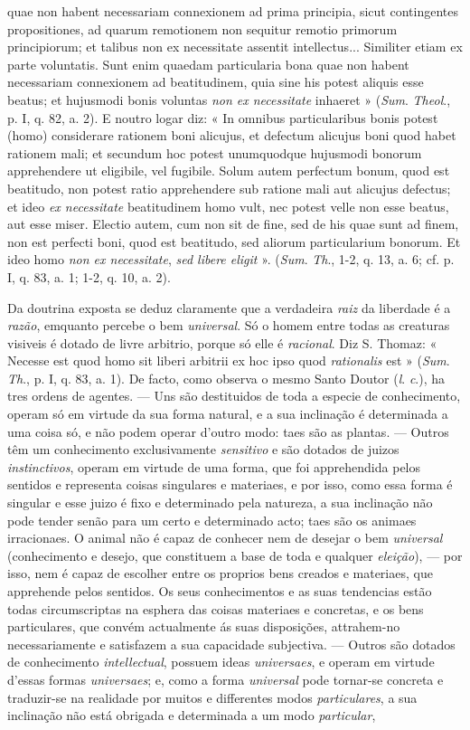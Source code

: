 quae non habent necessariam connexionem ad prima principia, sicut contingentes propositiones, ad quarum remotionem non sequitur remotio primorum principiorum; et talibus non ex necessitate assentit intellectus... Similiter etiam ex parte voluntatis. Sunt enim quaedam particularia bona quae non habent necessariam connexionem ad beatitudinem, quia sine his potest aliquis esse beatus; et hujusmodi bonis voluntas \emph{non ex necessitate} inhaeret » (\emph{Sum}. \emph{Theol}., p. I, q. 82, a. 2). E noutro logar diz: « In omnibus particularibus bonis potest (homo) considerare rationem boni alicujus, et defectum alicujus boni quod habet rationem mali; et secundum hoc potest unumquodque hujusmodi bonorum apprehendere ut eligibile, vel fugibile. Solum autem perfectum bonum, quod est beatitudo, non potest ratio apprehendere sub ratione mali aut alicujus defectus; et ideo \emph{ex necessitate} beatitudinem homo vult, nec potest velle non esse beatus, aut esse miser. Electio autem, cum non sit de fine, sed de his quae sunt ad finem, non est perfecti boni, quod est beatitudo, sed aliorum particularium bonorum. Et ideo homo \emph{non ex necessitate}, \emph{sed libere eligit} ». (\emph{Sum}. \emph{Th}., 1-2, q. 13, a. 6; cf. p. I, q. 83, a. 1; 1-2, q. 10, a. 2).\par Da doutrina exposta se deduz claramente que a verdadeira \emph{raiz} da liberdade é a \emph{razão}, emquanto percebe o bem \emph{universal}. Só o homem entre todas as creaturas visiveis é dotado de livre arbitrio, porque só elle é \emph{racional}. Diz S. Thomaz: « Necesse est quod homo sit liberi arbitrii ex hoc ipso quod \emph{rationalis} est » (\emph{Sum}. \emph{Th}., p. I, q. 83, a. 1). De facto, como observa o mesmo Santo Doutor (\emph{l}. \emph{c}.), ha tres ordens de agentes. --- Uns são destituidos de toda a especie de conhecimento, operam só em virtude da sua forma natural, e a sua inclinação é determinada a uma coisa só, e não podem operar d'outro modo: taes são as plantas. --- Outros têm um conhecimento exclusivamente \emph{sensitivo} e são dotados de juizos \emph{instinctivos}, operam em virtude de uma forma, que foi apprehendida pelos sentidos e representa coisas singulares e materiaes, e por isso, como essa forma é singular e esse juizo é fixo e determinado pela natureza, a sua inclinação não pode tender senão para um certo e determinado acto; taes são os animaes irracionaes. O animal não é capaz de conhecer nem de desejar o bem \emph{universal} (conhecimento e desejo, que constituem a base de toda e qualquer \emph{eleição}), --- por isso, nem é capaz de escolher entre os proprios bens creados e materiaes, que apprehende pelos sentidos. Os seus conhecimentos e as suas tendencias estão todas circumscriptas na esphera das coisas materiaes e concretas, e os bens particulares, que convém actualmente ás suas disposições, attrahem-no necessariamente e satisfazem a sua capacidade subjectiva. --- Outros são dotados de conhecimento \emph{intellectual}, possuem ideas \emph{universaes}, e operam em virtude d'essas formas \emph{universaes}; e, como a forma \emph{universal} pode tornar-se concreta e traduzir-se na realidade por muitos e differentes modos \emph{particulares}, a sua inclinação não está obrigada e determinada a um modo \emph{particular}, 